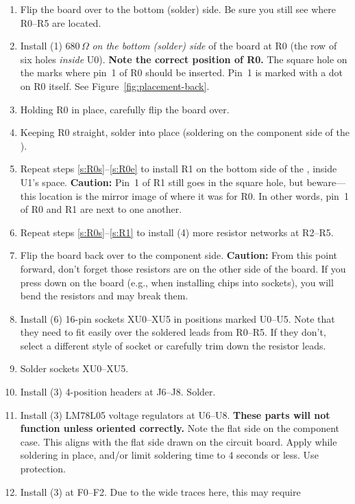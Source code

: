 \documentclass[letterpaper,twoside,onecolumn,openright,final]{memoir}
\begin{document}
\begin{enumerate}
\item	Flip the board over to the bottom (solder) side.  Be sure you still see where R0--R5 are
	located.
\item\label{s:R0s}
	Install (1) 680\,$\Omega$  \emph{on the bottom (solder) side} of the board at
	R0 (the row of six holes \emph{inside} U0).  {\bfseries Note the correct position of R0.} The
	square hole on the  marks where pin~1 of R0 should be inserted.  Pin~1 is marked
	with a dot on R0 itself. See Figure~\ref{fig:placement-back}.
\item	Holding R0 in place, carefully flip the board over.
\item\label{s:R0e}
	Keeping R0 straight, solder into place (soldering on the component side of the ).
\item\label{s:R1}
	Repeat steps \ref{s:R0s}--\ref{s:R0e} to install R1 on the bottom side of the ,
	inside U1's space.  {\bfseries Caution:} Pin~1 of R1 still goes in the square hole, but 
	beware---this location is the mirror image of where it was for R0.  In other words, pin~1
	of R0 and R1 are next to one another.
\item	Repeat steps \ref{s:R0s}--\ref{s:R1} to install (4) more resistor networks at R2--R5.
\item	Flip the board back over to the component side.  {\bfseries Caution:} From this point 
	forward, don't forget those resistors are on the other side of the board.  If you press down
	on the board (e.g., when installing chips into sockets), you will bend the resistors and may
	break them.
\item	Install (6) 16-pin  sockets XU0--XU5 in positions marked U0--U5.  
	Note that they need to fit easily
	over the soldered leads from R0--R5.  If they don't, select a different style of socket or
	carefully trim down the resistor leads.
\item	Solder sockets XU0--XU5.
\item	Install (3) 4-position  headers at J6--J8.  Solder.
\item	Install (3) LM78L05 voltage regulators at U6--U8.  
	{\bfseries These parts will not function unless oriented correctly.}  Note the flat side on
	the component case.  This aligns with the flat side drawn on the circuit board.
	Apply  while soldering in
	place, and/or limit soldering time to 4 seconds or less.  Use  protection.
\item	Install (3)  at F0--F2.  Due to the wide  traces here, this may require

\end{enumerate}
\end{document}

